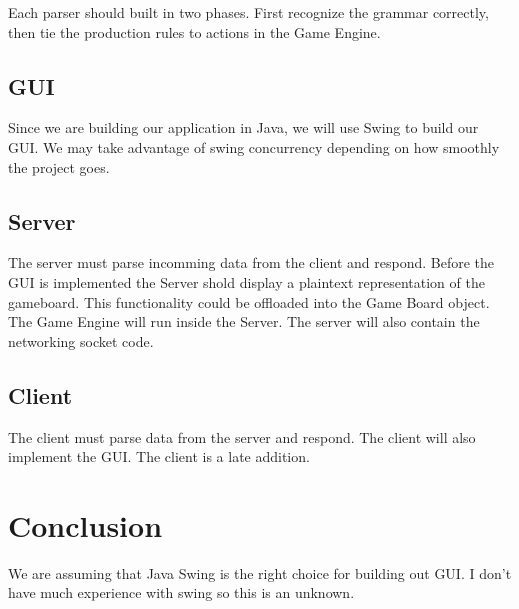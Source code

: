 \documentclass{article}
\begin{document}
Each parser should built in two phases. First recognize the grammar correctly, then 
tie the production rules to actions in the Game Engine.


\subsection{GUI}
Since we are building our application in Java, we will use Swing to build 
our GUI. We may take advantage of swing concurrency depending on how 
smoothly the project goes. 

\subsection{Server}
The server must parse incomming data from the client and respond.
Before the GUI is implemented the Server shold display a plaintext representation 
of the gameboard. This functionality could be offloaded into the Game Board object.
The Game Engine will run inside the Server. The server will also contain the networking
socket code.

\subsection{Client}
The client must parse data from the server and respond. The client will also
implement the GUI. The client is a late addition.  

\section{Conclusion} %
We are assuming that Java Swing is the right choice for building out GUI.
I don't have much experience with swing so this is an unknown. 
\end{document}

